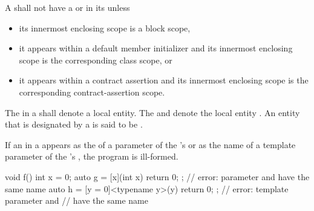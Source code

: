 \pnum
A  shall not have
a  or 
in its 
unless
\begin{itemize}
\item
its innermost enclosing scope is a block scope,
\item
it appears within a default member initializer
and its innermost enclosing scope is
the corresponding class scope, or
\item
it appears within a contract assertion
and its innermost enclosing scope
is the corresponding contract-assertion scope.
\end{itemize}

\pnum
The  in a 
shall denote a local entity.
The   and 
denote the local entity .
An entity that is designated by a
is said to be .

\pnum
If an  in a  appears
as the  of a parameter of
the 's 
or as the name of a template parameter of
the 's ,
the program is ill-formed.
\begin{example}
\begin{codeblock}
void f() {
  int x = 0;
  auto g = [x](int x) { return 0; };    // error: parameter and  have the same name
  auto h = [y = 0]<typename y>(y) { return 0; };    // error: template parameter and 
                                                    // have the same name
}
\end{codeblock}
\end{example}

